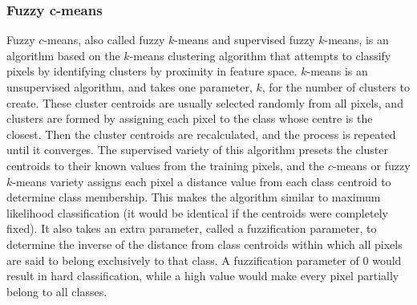 \documentclass[a4paper,10pt]{book}
\begin{document}
\begin{table}
  \begin{center}
  \end{center}
  \caption{Feature comparison between classification algorithms whose classification accuracy will be compared in the thesis. ``Partially fuzzy'' means the capability of training only on endmember pixels.}
  \label{tbl-comparison}
\end{table}

\subsubsection{Fuzzy c-means}

Fuzzy $c$-means, also called fuzzy $k$-means and supervised fuzzy $k$-means, is an algorithm based on the $k$-means clustering algorithm that attempts to classify pixels by identifying clusters by proximity in feature space. $k$-means is an unsupervised algorithm, and takes one parameter, $k$, for the number of clusters to create. These cluster centroids are usually selected randomly from all pixels, and clusters are formed by assigning each pixel to the class whose centre is the closest. Then the cluster centroids are recalculated, and the process is repeated until it converges. The supervised variety of this algorithm presets the cluster centroids to their known values from the training pixels, and the $c$-means or fuzzy $k$-means variety assigns each pixel a distance value from each class centroid to determine class membership. This makes the algorithm similar to maximum likelihood classification (it would be identical if the centroids were completely fixed). It also takes an extra parameter, called a fuzzification parameter, to determine the inverse of the distance from class centroids within which all pixels are said to belong exclusively to that class. A fuzzification parameter of 0 would result in hard classification, while a high value would make every pixel partially belong to all classes. \citep{hengl2004fuzzycmeans}
\end{document}
